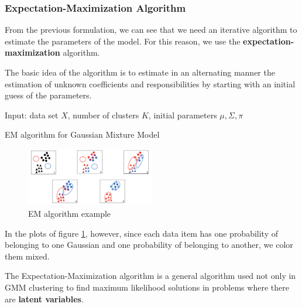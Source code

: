 \subsubsection*{Expectation-Maximization Algorithm}

From the previous formulation, we can see that we need an iterative algorithm to estimate the parameters of the model. For this reason, we use the \textbf{expectation-maximization} algorithm.

The basic idea of the algorithm is to estimate in an alternating manner the estimation of unknown coefficients and responsibilities by starting with an initial guess of the parameters.

\begin{algorithm}
    \SetAlgoLined
    Input: data set $X$, number of clusters $K$, initial parameters $\mu, \Sigma, \pi$ \\
    \caption{EM algorithm for Gaussian Mixture Model}
\end{algorithm}

\begin{figure}
    \centering
    \includegraphics[width=0.5\textwidth]{./figures/chapter_7/emex.png}
    \caption{EM algorithm example}
    \label{fig:emex}
\end{figure}

In the plots of figure \ref{fig:emex}, however, since each data item has one probability of belonging to one Gaussian and one probability of belonging to another, we color them mixed.

The Expectation-Maximization algorithm is a general algorithm used not only in GMM clustering to find maximum likelihood solutions in problems where there are \textbf{latent variables}.

